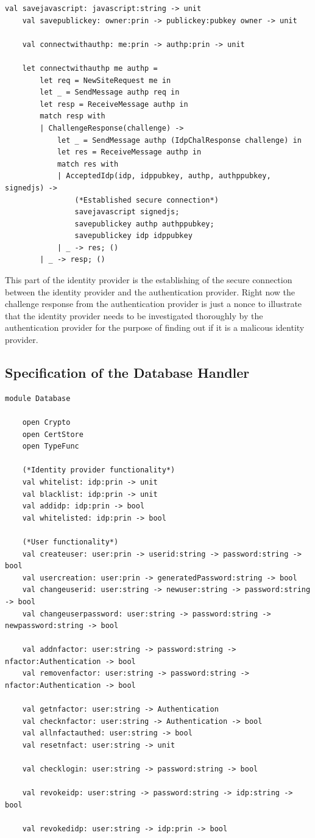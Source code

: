 \documentclass[twosided]{report}
\begin{document}
\begin{lstlisting}[style=fstar, caption={Establising a secure connection with Authentication Provider}]
	val savejavascript: javascript:string -> unit
	val savepublickey: owner:prin -> publickey:pubkey owner -> unit

	val connectwithauthp: me:prin -> authp:prin -> unit

	let connectwithauthp me authp =
		let req = NewSiteRequest me in
		let _ = SendMessage authp req in
		let resp = ReceiveMessage authp in
		match resp with
		| ChallengeResponse(challenge) ->
			let _ = SendMessage authp (IdpChalResponse challenge) in
			let res = ReceiveMessage authp in
			match res with
			| AcceptedIdp(idp, idppubkey, authp, authppubkey, signedjs) ->
				(*Established secure connection*)
				savejavascript signedjs;
				savepublickey authp authppubkey;
				savepublickey idp idppubkey
			| _ -> res; ()
		| _ -> resp; ()
\end{lstlisting}

This part of the identity provider is the establishing of the secure connection between the identity provider and the authentication provider. Right now the challenge response from the authentication provider is just a nonce to illustrate that the identity provider needs to be investigated thoroughly by the authentication provider for the purpose of finding out if it is a malicous identity provider.

\clearpage
\subsection{Specification of the Database Handler}
\begin{lstlisting}[style=fstar, caption={Specification of the database}]
	module Database
	
	open Crypto
	open CertStore
	open TypeFunc

	(*Identity provider functionality*)
	val whitelist: idp:prin -> unit
	val blacklist: idp:prin -> unit
	val addidp: idp:prin -> bool
	val whitelisted: idp:prin -> bool

	(*User functionality*)
	val createuser: user:prin -> userid:string -> password:string -> bool
	val usercreation: user:prin -> generatedPassword:string -> bool
	val changeuserid: user:string -> newuser:string -> password:string -> bool
	val changeuserpassword: user:string -> password:string -> newpassword:string -> bool

	val addnfactor: user:string -> password:string -> nfactor:Authentication -> bool
	val removenfactor: user:string -> password:string -> nfactor:Authentication -> bool

	val getnfactor: user:string -> Authentication
	val checknfactor: user:string -> Authentication -> bool
	val allnfactauthed: user:string -> bool
	val resetnfact: user:string -> unit

	val checklogin: user:string -> password:string -> bool

	val revokeidp: user:string -> password:string -> idp:string -> bool

	val revokedidp: user:string -> idp:prin -> bool
\end{lstlisting}
\end{document}
